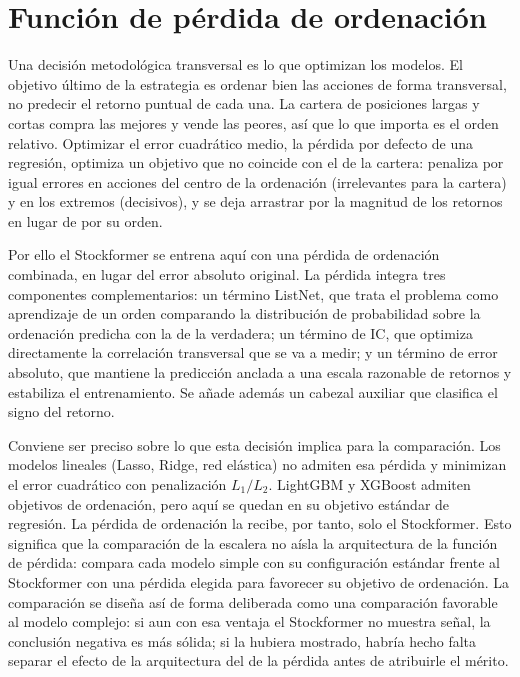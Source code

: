 \section{Función de pérdida de ordenación}\label{sec:met-loss}

Una decisión metodológica transversal es lo que optimizan los modelos. El objetivo último
de la estrategia es ordenar bien las acciones de forma transversal, no predecir el retorno
puntual de cada una. La cartera de posiciones largas y cortas compra las mejores y vende
las peores, así que lo que importa es el orden relativo. Optimizar el error cuadrático
medio, la pérdida por defecto de una regresión, optimiza un objetivo que no coincide con
el de la cartera: penaliza por igual errores en acciones del centro de la ordenación
(irrelevantes para la cartera) y en los extremos (decisivos), y se deja arrastrar por la
magnitud de los retornos en lugar de por su orden.

Por ello el Stockformer se entrena aquí con una pérdida de ordenación combinada, en lugar
del error absoluto original. La pérdida integra tres componentes complementarios: un
término ListNet, que trata el problema como aprendizaje de un orden comparando la
distribución de probabilidad sobre la ordenación predicha con la de la verdadera; un
término de IC, que optimiza directamente la correlación transversal que se va a medir; y
un término de error absoluto, que mantiene la predicción anclada a una escala razonable de
retornos y estabiliza el entrenamiento. Se añade además un cabezal auxiliar que clasifica
el signo del retorno.

Conviene ser preciso sobre lo que esta decisión implica para la comparación. Los modelos
lineales (Lasso, Ridge, red elástica) no admiten esa pérdida y minimizan el error
cuadrático con penalización \(L_1/L_2\). LightGBM y XGBoost admiten objetivos de
ordenación, pero aquí se quedan en su objetivo estándar de regresión. La pérdida de
ordenación la recibe, por tanto, solo el Stockformer. Esto significa que la comparación de
la escalera no aísla la arquitectura de la función de pérdida: compara cada modelo simple
con su configuración estándar frente al Stockformer con una pérdida elegida para
favorecer su objetivo de ordenación. La comparación se diseña así de forma deliberada como
una comparación favorable al modelo complejo: si aun con esa ventaja el Stockformer no
muestra señal, la conclusión negativa es más sólida; si la hubiera mostrado, habría hecho
falta separar el efecto de la arquitectura del de la pérdida antes de atribuirle el
mérito.

